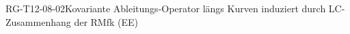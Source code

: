 
\begin{PROP}{RG-T12-08-02}{Kovariante Ableitungs-Operator längs Kurven induziert durch LC-Zusammenhang der RMfk (EE)}
\end{PROP}
